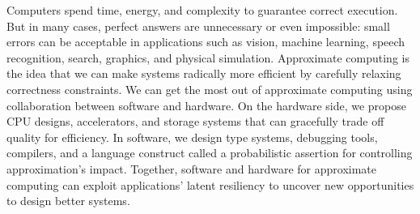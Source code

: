 Computers spend time, energy, and complexity to guarantee correct execution. But in many cases, perfect answers are unnecessary or even impossible: small errors can be acceptable in applications such as vision, machine learning, speech recognition, search, graphics, and physical simulation. Approximate computing is the idea that we can make systems radically more efficient by carefully relaxing correctness constraints. We can get the most out of approximate computing using collaboration between software and hardware. On the hardware side, we propose CPU designs, accelerators, and storage systems that can gracefully trade off quality for efficiency. In software, we design type systems, debugging tools, compilers, and a language construct called a probabilistic assertion for controlling approximation's impact. Together, software and hardware for approximate computing can exploit applications' latent resiliency to uncover new opportunities to design better systems.
